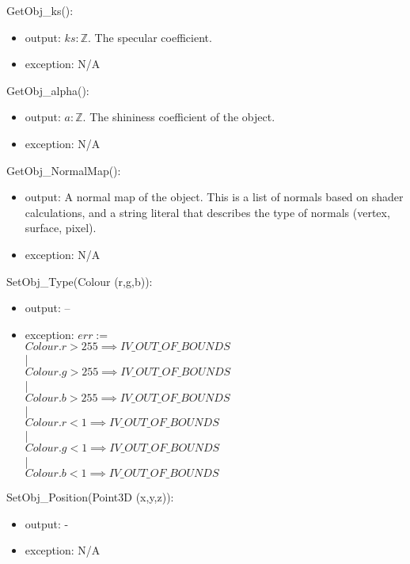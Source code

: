 \documentclass[12pt, titlepage]{article}
\begin{document}
\noindent GetObj\_ks():
\begin{itemize}
	\item output: $ks : \mathbb{Z}$. The specular coefficient.
	\item exception: N/A
\end{itemize}

\noindent GetObj\_alpha():
\begin{itemize}
	\item output: $a : \mathbb{Z}$. The shininess coefficient of the object.
	\item exception: N/A
\end{itemize}

\noindent GetObj\_NormalMap():
\begin{itemize}
	\item output: A normal map of the object. This is a list of normals based 
	on shader calculations, and a string literal that describes the type of 
	normals (vertex, surface, pixel).
	\item exception: N/A
\end{itemize}
\noindent SetObj\_Type(Colour (r,g,b)):
\begin{itemize}
	\item output: --
	\item exception: $err := $\\
	 $Colour.r > 255 \implies IV\_OUT\_OF\_BOUNDS$ \\
	 | \\
	 $Colour.g > 255 \implies IV\_OUT\_OF\_BOUNDS$ \\
	 | \\
	 $Colour.b > 255 \implies IV\_OUT\_OF\_BOUNDS$	\\
	 | \\
	 $Colour.r < 1 \implies IV\_OUT\_OF\_BOUNDS$ \\
	 | \\
	 $Colour.g < 1 \implies IV\_OUT\_OF\_BOUNDS$ \\
	 | \\
	 $Colour.b < 1 \implies IV\_OUT\_OF\_BOUNDS$	\\	 
\end{itemize}

\noindent SetObj\_Position(Point3D (x,y,z)):
\begin{itemize}
	\item output: -
	\item exception: N/A
\end{itemize}
\end{document}

